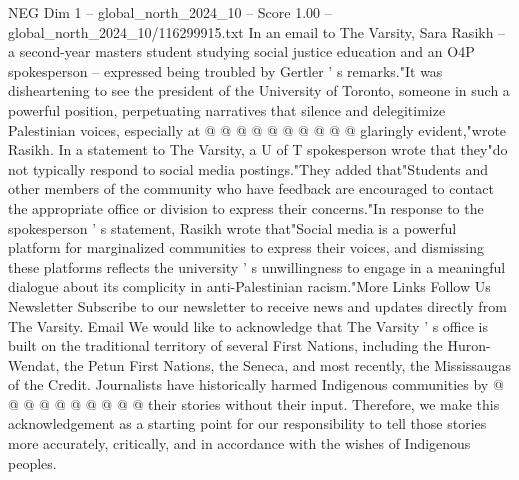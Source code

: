 \begin{textsample}{NEG Dim 1 – global\_north\_2024\_10 – Score 1.00 – global\_north\_2024\_10/116299915.txt}
In an email to The Varsity, Sara Rasikh -- a second-year masters student studying social justice education and an O4P spokesperson -- expressed being troubled by Gertler ' s remarks."It was disheartening to see the president of the University of Toronto, someone in such a powerful position, perpetuating narratives that silence and delegitimize Palestinian voices, especially at @ @ @ @ @ @ @ @ @ @ glaringly evident,"wrote Rasikh.
In a statement to The Varsity, a U of T spokesperson wrote that they"do not typically respond to social media postings."They added that"Students and other members of the community who have feedback are encouraged to contact the appropriate office or division to express their concerns."In response to the spokesperson ' s statement, Rasikh wrote that"Social media is a powerful platform for marginalized communities to express their voices, and dismissing these platforms reflects the university ' s unwillingness to engage in a meaningful dialogue about its complicity in anti-Palestinian racism."More Links Follow Us Newsletter Subscribe to our newsletter to receive news and updates directly from The Varsity.
Email We would like to acknowledge that The Varsity ' s office is built on the traditional territory of several First Nations, including the Huron-Wendat, the Petun First Nations, the Seneca, and most recently, the Mississaugas of the Credit.
Journalists have historically harmed Indigenous communities by @ @ @ @ @ @ @ @ @ @ their stories without their input.
Therefore, we make this acknowledgement as a starting point for our responsibility to tell those stories more accurately, critically, and in accordance with the wishes of Indigenous peoples.

\end{textsample}
